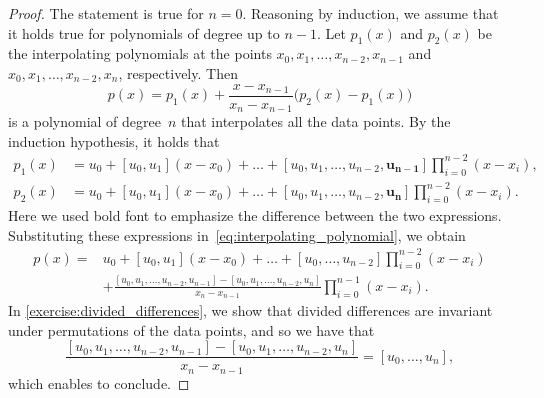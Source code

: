 \begin{proof}
    The statement is true for $n = 0$.
    Reasoning by induction, we assume that it holds true for polynomials of degree up to $n-1$.
    Let $p_1(x)$ and $p_2(x)$ be the interpolating polynomials at the points
    $x_0, x_1, \dotsc, x_{n-2}, x_{n-1}$ and $x_0, x_1, \dotsc, x_{n-2}, x_{n}$, respectively.
    Then
    \begin{equation}
        \label{eq:interpolating_polynomial}
        p(x) = p_1(x) + \frac{x - x_{n-1}}{x_n - x_{n-1}} \bigl(p_2(x) - p_1(x)\bigr)
    \end{equation}
    is a polynomial of degree~$n$ that interpolates all the data points.
    By the induction hypothesis,
    it holds that
    \begin{align*}
        p_1(x) &= u_0 + [u_0, u_1] (x - x_0) + \dotsc + [u_0, u_1, \dotsc, u_{n-2}, \mathbf{u_{n-1}}] \prod_{i=0}^{n-2} (x - x_i), \\
        p_2(x) &= u_0 + [u_0, u_1] (x - x_0) + \dotsc + [u_0, u_1, \dotsc, u_{n-2}, \mathbf{u_{n}}] \prod_{i=0}^{n-2} (x - x_i).
    \end{align*}
    Here we used bold font to emphasize the difference between the two expressions.
    Substituting these expressions in~\eqref{eq:interpolating_polynomial},
    we obtain
    \begin{align*}
        p(x) =
        &u_0 + [u_0, u_1] (x - x_0) + \dotsc + [u_0, \dotsc, u_{n-2}] \prod_{i=0}^{n-2} (x - x_i)  \\
        & + \frac{[u_0, u_1, \dotsc, u_{n-2}, u_{n-1}] - [u_0, u_1, \dotsc, u_{n-2}, u_{n}]}{x_n - x_{n-1}} \prod_{i=0}^{n-1} (x - x_i).
    \end{align*}
    In \cref{exercise:divided_differences},
    we show that divided differences are invariant under permutations of the data points,
    and so we have that
    \[
        \frac{[u_0, u_1, \dotsc, u_{n-2}, u_{n-1}] - [u_0, u_1, \dotsc, u_{n-2}, u_{n}]}{x_n - x_{n-1}} = [u_0, \dotsc, u_n],
    \]
    which enables to conclude.

\end{proof}
